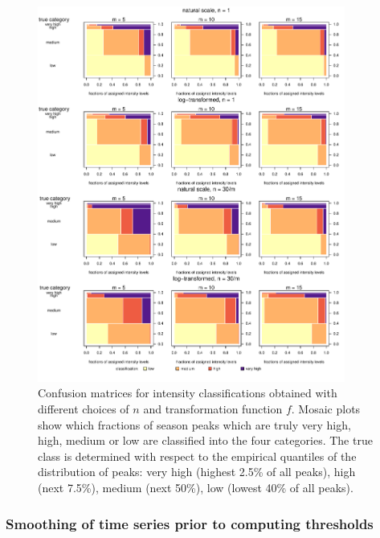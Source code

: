 \documentclass[12pt]{article}
\begin{document}
\begin{figure}
\includegraphics[width=0.9\textwidth]{figure/mosaic_fr.pdf}
\caption{Confusion matrices for intensity classifications obtained with different choices of $n$ and transformation function $f$. Mosaic plots show which fractions of season peaks which are truly very high, high, medium or low are classified into the four categories. The true class is determined with respect to the empirical quantiles of the distribution of peaks: very high (highest 2.5\% of all peaks), high (next 7.5\%), medium (next 50\%), low (lowest 40\% of all peaks).}
\label{fig:mosaic}
\end{figure}



\subsubsection{Smoothing of time series prior to computing thresholds}
\label{subsec:sim_smoothing}
\end{document}
